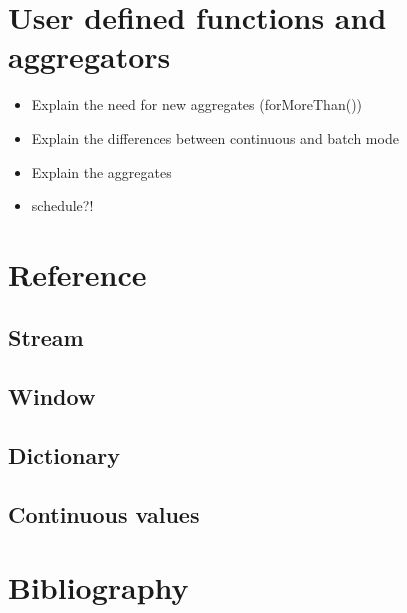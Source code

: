 \documentclass{report}
\begin{document}
\chapter{User defined functions and aggregators}
\label{chap:udfs}

\begin{itemize}
\item Explain the need for new aggregates (forMoreThan())
\item Explain the differences between continuous and batch mode
\item Explain the aggregates
\item schedule?!
\end{itemize}
\chapter{Reference}

\section{Stream}

\section{Window}

\section{Dictionary}

\section{Continuous values}

\chapter{Bibliography}
\end{document}
